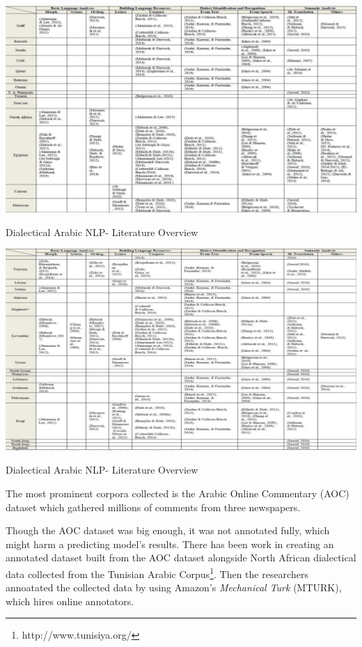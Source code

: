 \documentclass[12pt]{diazessay}
\begin{document}
    \clearpage
    \begin{table}[h]
        \hskip-3cm
        \includegraphics[scale=0.45]{Figures/past_word_1.png}
        \caption{Dialectical Arabic NLP- Literature Overview\cite{shoufan_alameri_2015_natural}}
        \label{fig:cmp}
    \end{table}
    
    \clearpage
    \begin{table}[h]
        \hskip-3cm
        \includegraphics[scale=0.45]{Figures/past_work_2.png}
        \caption{Dialectical Arabic NLP- Literature Overview\cite{shoufan_alameri_2015_natural}}
        \label{fig:cmp}
    \end{table}
    \clearpage
    
    
    The most prominent corpora collected is the Arabic Online Commentary (AOC) dataset which gathered millions of comments from three newspapers\cite{zaidan_burch}\label{txt:aoc}.
    
    Though the AOC dataset was big enough, it was not annotated fully, which might harm a predicting model's results. There has been work in creating an annotated dataset built from the AOC dataset alongside North African dialectical data collected from the Tunisian Arabic Corpus\footnote{http://www.tunisiya.org/}. Then the researchers annoatated the collected data by using Amazon's \emph{Mechanical Turk} (MTURK), which hires online annotators\cite{el_haj_etal_2018_arabic}.
     
\end{document}
